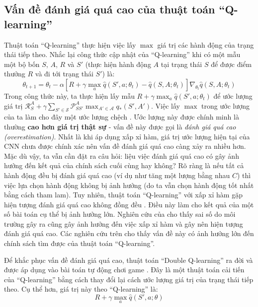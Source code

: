 \subsection{Vấn đề đánh giá quá cao của thuật toán ``Q-learning''}
	Thuật toán ``Q-learning'' thực hiện việc lấy $\max$ giá trị các hành động của trạng thái tiếp theo.
	Nhắc lại công thức cập nhật của ``Q-learning'' khi có một mẫu một bộ bốn $S$, $A$, $R$ và $S'$ (thực hiện hành động $A$ tại trạng thái $S$ để được điểm thưởng $R$ và đi tới trạng thái $S'$) là:
	\begin{equation}
		\theta_{t+1} = \theta_t - \alpha \left[ R + \gamma \max_{a}\hat{q}(S', a;\theta_t) - \hat{q}(S,A;\theta_t) \right] \nabla_{\theta_t} \hat{q}(S, A;\theta_t)	
	\end{equation}
	Trong công thức này, ta thực hiện lấy mẫu $R + \gamma \max_{a}\hat{q}(S', a;\theta_t)$ để ước lượng giá trị $\mathcal{R}_{S}^{A} + \gamma \sum_{S' \in \mathcal{S}} \mathcal{P}_{SS'}^{A} \max_{A' \in \mathcal{A}} q_{*}(S', A')$.
	Việc lấy $\max$ trong ước lượng của ta làm cho đây một ước lượng chệch \cite{hasselt2010double}.
	Ước lượng này được chính minh là thường \textbf{cao hơn giá trị thật sự} - vấn đề này được gọi là \textit{đánh giá quá cao (overestimation)}.
	Nhất là khi áp dụng xấp xỉ hàm, giá trị ước lượng hiện tại của CNN chưa được chính xác nên vấn đề đánh giá quá cao càng xảy ra nhiều hơn.
	Mặc dù vậy, ta vẫn cần đặt ra câu hỏi: liệu việc đánh giá quá cao có gây ảnh hưởng đến kết quả của chính sách cuối cùng hay không?
	Rõ ràng là nếu tất cả hành động đều bị đánh giá quá cao (ví dụ như tăng một lượng bằng nhau $C$) thì việc lựa chọn hành động không bị ảnh hưởng (do ta vẫn chọn hành động tốt nhất bằng cách tham lam).
	Tuy nhiên, thuật toán ``Q-learning'' với xấp xỉ hàm gặp hiện tượng đánh giá quá cao không đồng đều \cite{van2015deep}.
	Điều này làm cho kết quả của một số bài toán cụ thể bị ảnh hưởng lớn.
	Nghiên cứu của \cite{hasselt2010double} cho thấy sai số do môi trường gây ra cũng gây ảnh hưởng đến việc xấp xỉ hàm và gây nên hiện tượng đánh giá quá cao.
	Các nghiên cứu trên cho thấy vấn đề này có ảnh hưởng lớn đến chính sách tìm được của thuật toán ``Q-learning''.
	
	Để khắc phục vấn đề đánh giá quá cao, thuật toán ``Double Q-learning'' \cite{hasselt2010double} ra đời và được áp dụng vào bài toán tự động chơi game \cite{van2015deep}.
	Đây là một thuật toán cải tiến của ``Q-learning'' bằng cách thay đổi lại cách ước lượng giá trị của trạng thái tiếp theo.
	Cụ thể hơn, giá trị này theo ``Q-learning'' là: 
	\begin{equation}
		\label{eq_q_max_target}
		R + \gamma \max_{a}\hat{q}(S', a;\theta)
	\end{equation}
	
